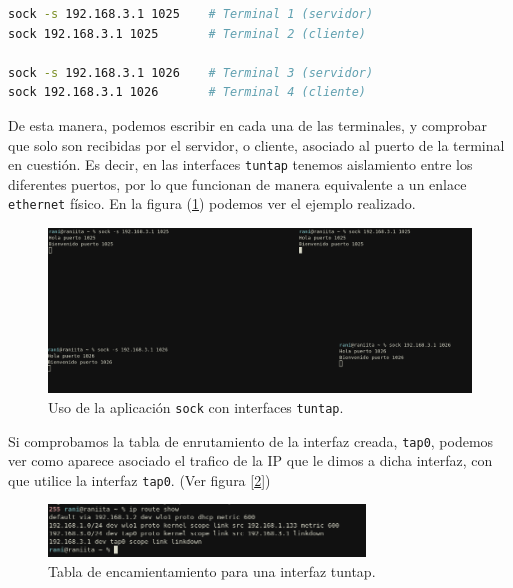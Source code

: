 \documentclass[12pt]{article}
\begin{document}
	\begin{lstlisting}[language=Bash, caption={Uso de aplicacion \texttt{sock} para crear cliente servidor asociado a un puerto}]
sock -s 192.168.3.1 1025    # Terminal 1 (servidor)
sock 192.168.3.1 1025       # Terminal 2 (cliente)

sock -s 192.168.3.1 1026    # Terminal 3 (servidor)
sock 192.168.3.1 1026       # Terminal 4 (cliente)
	\end{lstlisting}

	\pagebreak

	\noindent De esta manera, podemos escribir en cada una de las terminales, y comprobar que solo son recibidas por el servidor, o cliente, asociado al puerto de la terminal en cuestión. Es decir, en las interfaces \texttt{tuntap} tenemos aislamiento entre los diferentes puertos, por lo que funcionan de manera equivalente a un enlace \texttt{ethernet} físico. En la figura (\ref{img: ejemplo sock}) podemos ver el ejemplo realizado.
	
	\begin{figure}[h!]
		\begin{center}
			\includegraphics[width=1\textwidth]{img/ejemplo_sock.png}
			\caption{Uso de la aplicación \texttt{sock} con interfaces \texttt{tuntap}.}
			\label{img: ejemplo sock}
		\end{center}
	\end{figure}
	
	\noindent Si comprobamos la tabla de enrutamiento de la interfaz creada, \texttt{tap0}, podemos ver como aparece asociado el trafico de la IP que le dimos a dicha interfaz, con que utilice la interfaz \texttt{tap0}. (Ver figura [\ref{img: ip route tap}])
	
	\begin{figure}[h!]
		\begin{center}
			\includegraphics[width=0.75\textwidth]{img/tabla_encaminamiento_tuntap.png}
			\caption{Tabla de encamientamiento para una interfaz tuntap.}
			\label{img: ip route tap}
		\end{center}
	\end{figure}
\end{document}
